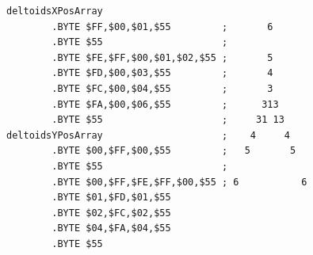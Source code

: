 \begin{minipage}[b]{0.48\linewidth}
\begin{lrbox}{\mybox}%
\hspace{1cm}
\begin{lstlisting}[basicstyle=\ttfamily\tiny,escapechar=\%]
deltoidsXPosArray                     
        .BYTE $FF,$00,$01,$55         ;       6      
        .BYTE $55                     ;              
        .BYTE $FE,$FF,$00,$01,$02,$55 ;       5      
        .BYTE $FD,$00,$03,$55         ;       4      
        .BYTE $FC,$00,$04,$55         ;       3      
        .BYTE $FA,$00,$06,$55         ;      313     
        .BYTE $55                     ;     31 13    
deltoidsYPosArray                     ;    4     4   
        .BYTE $00,$FF,$00,$55         ;   5       5  
        .BYTE $55                     ;              
        .BYTE $00,$FF,$FE,$FF,$00,$55 ; 6           6
        .BYTE $01,$FD,$01,$55
        .BYTE $02,$FC,$02,$55
        .BYTE $04,$FA,$04,$55
        .BYTE $55
\end{lstlisting}
\end{lrbox}%
\scalebox{0.8}{\usebox{\mybox}}

\end{minipage}
%
%
